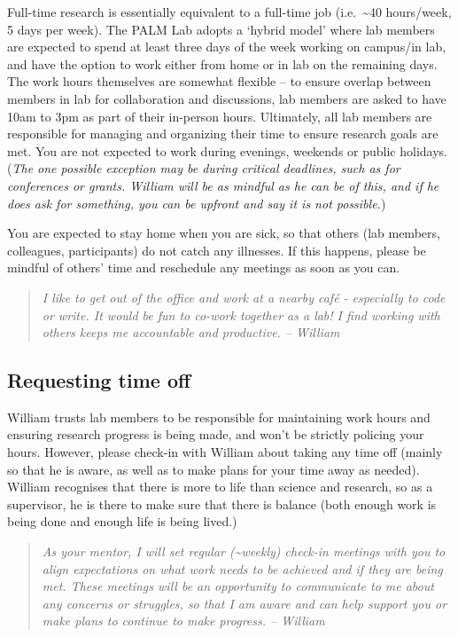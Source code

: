 \documentclass[
]{book}
\begin{document}
Full-time research is essentially equivalent to a full-time job (i.e.~\textasciitilde40 hours/week, 5 days per week). The PALM Lab adopts a `hybrid model' where lab members are expected to spend at least three days of the week working on campus/in lab, and have the option to work either from home or in lab on the remaining days. The work hours themselves are somewhat flexible -- to ensure overlap between members in lab for collaboration and discussions, lab members are asked to have 10am to 3pm as part of their in-person hours. Ultimately, all lab members are responsible for managing and organizing their time to ensure research goals are met. You are not expected to work during evenings, weekends or public holidays. (\emph{The one possible exception may be during critical deadlines, such as for conferences or grants. William will be as mindful as he can be of this, and if he does ask for something, you can be upfront and say it is not possible.})

You are expected to stay home when you are sick, so that others (lab members, colleagues, participants) do not catch any illnesses. If this happens, please be mindful of others' time and reschedule any meetings as soon as you can.

\begin{quote}
\emph{I like to get out of the office and work at a nearby café - especially to code or write. It would be fun to co-work together as a lab! I find working with others keeps me accountable and productive. -- William}
\end{quote}

\hypertarget{requesting-time-off}{%
\subsection*{Requesting time off}\label{requesting-time-off}}

William trusts lab members to be responsible for maintaining work hours and ensuring research progress is being made, and won't be strictly policing your hours. However, please check-in with William about taking any time off (mainly so that he is aware, as well as to make plans for your time away as needed). William recognises that there is more to life than science and research, so as a supervisor, he is there to make sure that there is balance (both enough work is being done and enough life is being lived.)

\begin{quote}
\emph{As your mentor, I will set regular (\textasciitilde weekly) check-in meetings with you to align expectations on what work needs to be achieved and if they are being met. These meetings will be an opportunity to communicate to me about any concerns or struggles, so that I am aware and can help support you or make plans to continue to make progress. -- William}
\end{quote}
\end{document}
